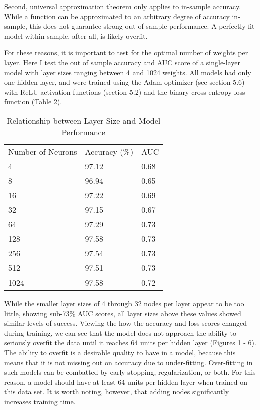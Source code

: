 \documentclass[12pt]{article}  %
\theoremstyle{definition}
\theoremstyle{remark}
\begin{document}
\par Second, universal approximation theorem only applies to in-sample accuracy. While a function can be approximated to an arbitrary degree of accuracy in-sample, this does not guarantee strong out of sample performance. A perfectly fit model within-sample, after all, is likely overfit. 

\par For these reasons, it is important to test for the optimal number of weights per layer. Here I test the out of sample accuracy and AUC score of a single-layer model with layer sizes ranging between 4 and 1024 weights. All models had only one hidden layer, and were trained using the Adam optimizer (see section 5.6) with ReLU activation functions (section 5.2) and the binary cross-entropy loss function (Table 2).

\begin{table}[!h]
\centering
\caption{Relationship between Layer Size and Model Performance}
\label{my-label}
\begin{tabular}{lll}
Number of Neurons & Accuracy (\%) & AUC  \\
4                 & 97.12         & 0.68 \\
8                 & 96.94         & 0.65 \\
16                & 97.22         & 0.69 \\
32                & 97.15         & 0.67 \\
64                & 97.29         & 0.73 \\
128               & 97.58         & 0.73 \\
256               & 97.54         & 0.73 \\
512               & 97.51         & 0.73 \\
1024              & 97.58         & 0.72
\end{tabular}
\end{table}


\par While the smaller layer sizes of 4 through 32 nodes per layer appear to be too little, showing sub-73\% AUC scores, all layer sizes above these values showed similar levels of success. Viewing the how the accuracy and loss scores changed during training, we can see that the model does not approach the ability to seriously overfit the data until it reaches 64 units per hidden layer (Figures 1 - 6). The ability to overfit is a desirable quality to have in a model, because this means that it is not missing out on accuracy due to under-fitting. Over-fitting in such models can be combatted by early stopping, regularization, or both. For this reason, a model should have at least 64 units per hidden layer when trained on this data set. It is worth noting, however, that adding nodes significantly increases training time.
\end{document}
